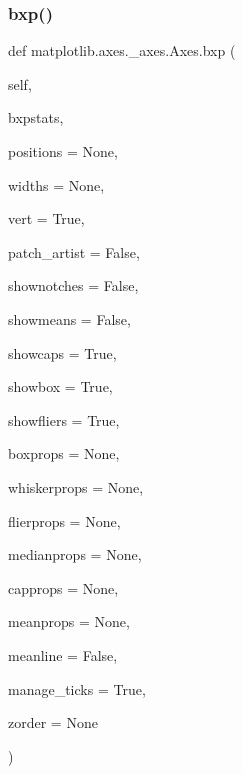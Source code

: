 \subsubsection{\texorpdfstring{bxp()}{bxp()}}
{\footnotesize\ttfamily def matplotlib.\+axes.\+\_\+axes.\+Axes.\+bxp (\begin{DoxyParamCaption}\item[{}]{self,  }\item[{}]{bxpstats,  }\item[{}]{positions = {\ttfamily None},  }\item[{}]{widths = {\ttfamily None},  }\item[{}]{vert = {\ttfamily True},  }\item[{}]{patch\+\_\+artist = {\ttfamily False},  }\item[{}]{shownotches = {\ttfamily False},  }\item[{}]{showmeans = {\ttfamily False},  }\item[{}]{showcaps = {\ttfamily True},  }\item[{}]{showbox = {\ttfamily True},  }\item[{}]{showfliers = {\ttfamily True},  }\item[{}]{boxprops = {\ttfamily None},  }\item[{}]{whiskerprops = {\ttfamily None},  }\item[{}]{flierprops = {\ttfamily None},  }\item[{}]{medianprops = {\ttfamily None},  }\item[{}]{capprops = {\ttfamily None},  }\item[{}]{meanprops = {\ttfamily None},  }\item[{}]{meanline = {\ttfamily False},  }\item[{}]{manage\+\_\+ticks = {\ttfamily True},  }\item[{}]{zorder = {\ttfamily None} }\end{DoxyParamCaption})}

